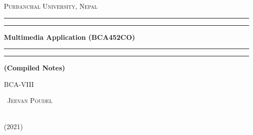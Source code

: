 	
\thispagestyle{empty}%

\begin{titlepage}
	\centering


	{\scshape\LARGE Purbanchal University, Nepal \par}
\vspace{0.5cm}
\vspace*{\baselineskip} %

\rule{\textwidth}{1.6pt}\vspace*{-\baselineskip}\vspace*{2pt} %
\rule{\textwidth}{0.4pt} %

\vspace{0.75\baselineskip} %

	{\huge\bfseries Multimedia Application (BCA452CO)\par}
	
	\vspace{0.75\baselineskip} %
	
	\rule{\textwidth}{0.4pt}\vspace*{-\baselineskip}\vspace{3.2pt} %
	\rule{\textwidth}{1.6pt} %
	
	\vspace{2\baselineskip} %
	
	{\normalsize \bfseries (Compiled Notes)}
	
	\vspace{2cm}
	
	{\Large\scshape BCA-VIII \par}


	\vfill

{\Huge\scshape ~{Jeevan Poudel}\par}


	\vfill



\vspace{0.3\baselineskip} 
	{\large ~{\vspace*{0.1cm} \\(2021)} \par} 
	

\end{titlepage}
